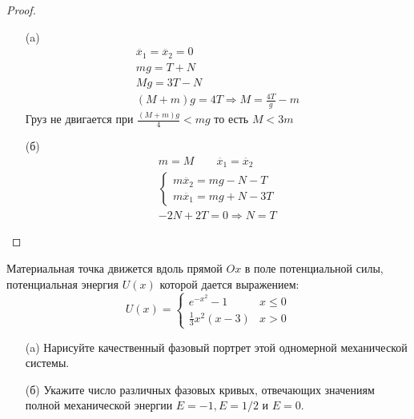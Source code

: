 \begin{proof}
\begin{itemize}
\item[]
\item[(a)]
    \begin{gather*}
        \ddot{x_1} = \ddot{x_2} = 0\\
        mg = T + N\\
        Mg = 3T - N\\
        \left(M + m\right)g = 4T\Rightarrow
        M = \frac{4T}{g} - m
    \end{gather*}
    Груз не двигается при $\frac{\left(M + m\right)g}{4} < mg$ то есть $M < 3m$
\item[(б)]
    \begin{gather*}
        m = M\qquad \ddot{x_1} = \ddot{x_2}\\
        \begin{cases}
            m\ddot{x_2} = mg - N - T\\
            m\ddot{x_1} = mg + N - 3T
        \end{cases}\\
        -2N + 2T = 0 \Rightarrow N = T 
    \end{gather*}
\end{itemize}
\end{proof}
\vskip 0.6in




\begin{prob}
Материальная точка движется вдоль прямой $O x$ в поле потенциальной силы, потенциальная энергия $U(x)$ которой дается выражением:
$$
U(x) =
\begin{cases}
    e^{-x^2}-1 & x \leq 0 \\
    \frac{1}{3} x^2\left(x-3\right) & x>0
\end{cases}
$$
\begin{itemize}
\item[(a)] Нарисуйте качественный фазовый портрет этой одномерной механической системы.
\item[(б)] Укажите число различных фазовых кривых, отвечающих значениям полной механической энергии $E=-1, E=1/2$ и $E=0$.
\end{itemize}
\end{prob}

